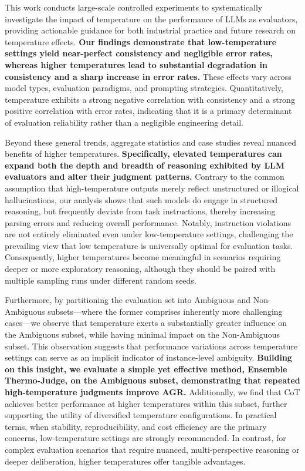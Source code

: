 \documentclass[11pt]{article}
\begin{document}
This work conducts large-scale controlled experiments to systematically investigate the impact of temperature on the performance of LLMs as evaluators, providing actionable guidance for both industrial practice and future research on temperature effects. \textbf{Our findings demonstrate that low-temperature settings yield near-perfect consistency and negligible error rates, whereas higher temperatures lead to substantial degradation in consistency and a sharp increase in error rates.} These effects vary across model types, evaluation paradigms, and prompting strategies. Quantitatively, temperature exhibits a strong negative correlation with consistency and a strong positive correlation with error rates, indicating that it is a primary determinant of evaluation reliability rather than a negligible engineering detail.

Beyond these general trends, aggregate statistics and case studies reveal nuanced benefits of higher temperatures. \textbf{Specifically, elevated temperatures can expand both the depth and breadth of reasoning exhibited by LLM evaluators and alter their judgment patterns.} Contrary to the common assumption that high-temperature outputs merely reflect unstructured or illogical hallucinations, our analysis shows that such models do engage in structured reasoning, but frequently deviate from task instructions, thereby increasing parsing errors and reducing overall performance. Notably, instruction violations are not entirely eliminated even under low-temperature settings, challenging the prevailing view that low temperature is universally optimal for evaluation tasks. Consequently, higher temperatures become meaningful in scenarios requiring deeper or more exploratory reasoning, although they should be paired with multiple sampling runs under different random seeds.

Furthermore, by partitioning the evaluation set into Ambiguous and Non-Ambiguous subsets—where the former comprises inherently more challenging cases—we observe that temperature exerts a substantially greater influence on the Ambiguous subset, while having minimal impact on the Non-Ambiguous subset. This observation suggests that performance variations across temperature settings can serve as an implicit indicator of instance-level ambiguity. \textbf{Building on this insight, we evaluate a simple yet effective method, Ensemble Thermo-Judge, on the Ambiguous subset, demonstrating that repeated high-temperature judgments improve AGR.} Additionally, we find that CoT achieves better performance at higher temperatures within this subset, further supporting the utility of diversified temperature configurations. In practical terms, when stability, reproducibility, and cost efficiency are the primary concerns, low-temperature settings are strongly recommended. In contrast, for complex evaluation scenarios that require nuanced, multi-perspective reasoning or deeper deliberation, higher temperatures offer tangible advantages.
\end{document}
